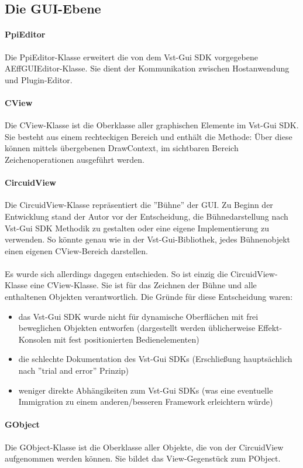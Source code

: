 \subsection{Die GUI-Ebene}
\paragraph{PpiEditor}
Die PpiEditor-Klasse erweitert die von dem Vst-Gui SDK vorgegebene \\
AEffGUIEditor-Klasse. Sie dient der Kommunikation zwischen Hostanwendung und Plugin-Editor.
\paragraph{CView}
Die CView-Klasse ist die Oberklasse aller graphischen Elemente im Vst-Gui SDK. Sie besteht aus einem rechteckigen Bereich und enthält die Methode:  Über diese können mittels übergebenen DrawContext, im sichtbaren Bereich Zeichenoperationen ausgeführt werden.
\paragraph{CircuidView}
Die CircuidView-Klasse repräsentiert die ''Bühne'' der GUI.
Zu Beginn der Entwicklung stand der Autor vor der Entscheidung, die Bühnedarstellung nach Vst-Gui SDK Methodik zu gestalten oder eine eigene Implementierung zu verwenden. So könnte genau wie in der Vst-Gui-Bibliothek, jedes Bühnenobjekt einen eigenen CView-Bereich darstellen.
\\\\
Es wurde sich allerdings dagegen entschieden. So ist einzig die CircuidView-Klasse eine CView-Klasse. Sie ist für das Zeichnen der Bühne und alle enthaltenen Objekten verantwortlich. Die Gründe für diese Entscheidung waren:
\begin{itemize}
	\item das Vst-Gui SDK wurde nicht für dynamische Oberflächen mit frei beweglichen Objekten entworfen (dargestellt werden üblicherweise Effekt-Konsolen mit fest positionierten Bedienelementen)
	\item die schlechte Dokumentation des Vst-Gui SDKs (Erschließung hauptsächlich nach ''trial and error'' Prinzip)
	\item weniger direkte Abhängikeiten zum Vst-Gui SDKs (was eine eventuelle Immigration zu einem anderen/besseren Framework erleichtern würde)
\end{itemize}
\paragraph{GObject}
Die GObject-Klasse ist die Oberklasse aller Objekte, die von der CircuidView aufgenommen werden können. Sie bildet das View-Gegenstück zum PObject.
